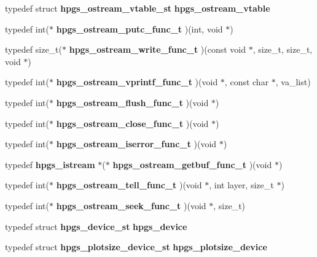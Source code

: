 \begin{CompactItemize}
\item 
typedef struct {\bf hpgs\_\-ostream\_\-vtable\_\-st} \textbf{hpgs\_\-ostream\_\-vtable}\label{group__base_g2b4c0b89aad0445c029e2d3845d5d360}

\item 
typedef int($\ast$ \textbf{hpgs\_\-ostream\_\-putc\_\-func\_\-t} )(int, void $\ast$)\label{group__base_g8c774072a71ef4f6dc25f996c4ded5ac}

\item 
typedef size\_\-t($\ast$ \textbf{hpgs\_\-ostream\_\-write\_\-func\_\-t} )(const void $\ast$, size\_\-t, size\_\-t, void $\ast$)\label{group__base_gfa6e15df29369bef01e53d5e93092489}

\item 
typedef int($\ast$ \textbf{hpgs\_\-ostream\_\-vprintf\_\-func\_\-t} )(void $\ast$, const char $\ast$, va\_\-list)\label{group__base_g2d992564508c4d5906649fb7d050b8fe}

\item 
typedef int($\ast$ \textbf{hpgs\_\-ostream\_\-flush\_\-func\_\-t} )(void $\ast$)\label{group__base_g150a622af849722d9fda7eec6fae0d48}

\item 
typedef int($\ast$ \textbf{hpgs\_\-ostream\_\-close\_\-func\_\-t} )(void $\ast$)\label{group__base_ga65e4bab9e215962cd7be730737d804f}

\item 
typedef int($\ast$ \textbf{hpgs\_\-ostream\_\-iserror\_\-func\_\-t} )(void $\ast$)\label{group__base_g41a536b40e02ad3f2699b66d653c875a}

\item 
typedef {\bf hpgs\_\-istream} $\ast$($\ast$ \textbf{hpgs\_\-ostream\_\-getbuf\_\-func\_\-t} )(void $\ast$)\label{group__base_g16f71e23dc6b7b0a2f3edfd69400fd32}

\item 
typedef int($\ast$ \textbf{hpgs\_\-ostream\_\-tell\_\-func\_\-t} )(void $\ast$, int layer, size\_\-t $\ast$)\label{group__base_g58fbc47400676e8566943232871e1d00}

\item 
typedef int($\ast$ \textbf{hpgs\_\-ostream\_\-seek\_\-func\_\-t} )(void $\ast$, size\_\-t)\label{group__base_gd2ade65e145c72c1093f3ccb009d80c6}

\item 
typedef struct {\bf hpgs\_\-device\_\-st} \textbf{hpgs\_\-device}\label{group__device_g100927b1ad4b437d61dddc42708fa8f3}

\item 
typedef struct {\bf hpgs\_\-plotsize\_\-device\_\-st} \textbf{hpgs\_\-plotsize\_\-device}\label{group__device_g98a37f93bf5799c2d55d6e59d9f2c1b1}


\end{CompactItemize}
